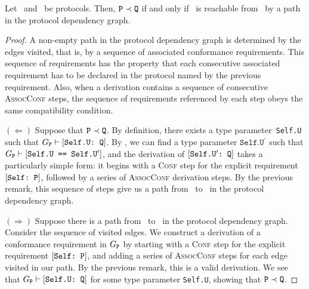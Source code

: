 \documentclass[../generics]{subfiles}
\begin{document}
\begin{proposition}
Let \tP\ and \tQ\ be protocols. Then, $\texttt{P}\prec\texttt{Q}$ if and only if \tQ\ is reachable from \tP\ by a path in the protocol dependency graph.
\end{proposition}
\begin{proof}
A non-empty path in the protocol dependency graph is determined by the edges visited, that is, by a sequence of associated conformance requirements. This sequence of requirements has the property that each consecutive associated requirement has to be declared in the protocol named by the previous requirement. Also, when a derivation contains a sequence of consecutive \textsc{AssocConf} steps, the sequence of requirements referenced by each step obeys the same compatibility condition.

$(\Leftarrow)$ Suppose that $\texttt{P}\prec\texttt{Q}$. By definition, there exists a type parameter~\texttt{Self.U} such that $G_{\texttt{P}}\vdash[\texttt{Self.U:~Q}]$. By , we can find a type parameter $\texttt{Self.U}^\prime$ such that $G_{\texttt{P}}\vdash[\texttt{Self.U == $\texttt{Self.U}^\prime$}]$, and the derivation of $[\texttt{$\texttt{Self.U}^\prime$:~Q}]$ takes a particularly simple form: it begins with a \textsc{Conf} step for the explicit requirement $[\texttt{Self:~P}]$, followed by a series of \textsc{AssocConf} derivation steps. By the previous remark, this sequence of steps give us a path from \tP\ to \tQ\ in the protocol dependency graph.

$(\Rightarrow)$ Suppose there is a path from \tP\ to \tQ\ in the protocol dependency graph. Consider the sequence of visited edges. We construct a derivation of a conformance requirement in $G_{\texttt{P}}$ by starting with a \textsc{Conf} step for the explicit requirement $[\texttt{Self:~P}]$, and adding a series of \textsc{AssocConf} steps for each edge visited in our path. By the previous remark, this is a valid derivation. We see that $G_{\texttt{P}}\vdash[\texttt{Self.U:~Q}]$ for some type parameter \texttt{Self.U}, showing that $\texttt{P}\prec\texttt{Q}$.
\end{proof}
\end{document}
